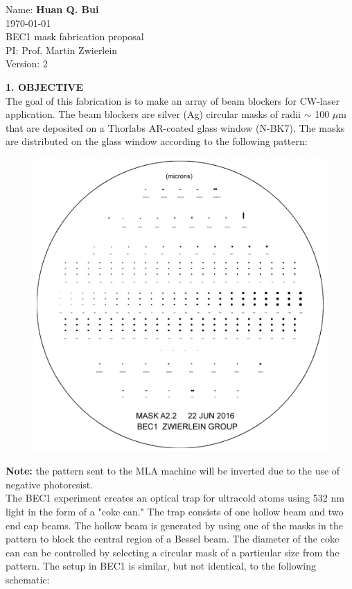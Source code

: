 \documentclass{article}
\theoremstyle{definition}
\begin{document}
\begin{framed}
\noindent Name: \textbf{Huan Q. Bui}\\
\today \\
BEC1 mask fabrication proposal \\
PI: Prof. Martin Zwierlein\\
Version: 2
\end{framed}


\noindent \textbf{1. OBJECTIVE}\\

\noindent The goal of this fabrication is to make an array of beam blockers for CW-laser application. The beam blockers are silver (Ag) circular masks of radii $\sim$ 100 $\mu$m that are deposited on a Thorlabs AR-coated glass window (N-BK7). The masks are distributed on the glass window according to the following pattern:

\begin{figure}[!htb]
\centering
\includegraphics[scale=0.35]{masks.png}
\end{figure}

\noindent \textbf{Note:} the pattern sent to the MLA machine will be inverted due to the use of negative photoresist.\\

\noindent The BEC1 experiment creates an optical trap for ultracold atoms using 532 nm light in the form of a "coke can." The trap consists of one hollow beam and two end cap beams. The hollow beam is generated by using one of the masks in the pattern to block the central region of a Bessel beam. The diameter of the coke can can be controlled by selecting a circular mask of a particular size from the pattern. The setup in BEC1 is similar, but not identical, to the following schematic:
\end{document}
